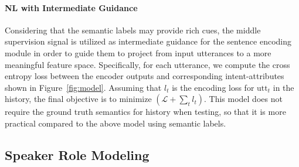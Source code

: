 \documentclass[11pt,letterpaper]{article}
\begin{document}
\paragraph{NL with Intermediate Guidance}
Considering that the semantic labels may provide rich cues, the middle supervision signal is utilized as intermediate guidance for the sentence encoding module in order to guide them to project from input utterances to a more meaningful feature space.
Specifically, for each utterance, we compute the cross entropy loss between the encoder outputs and corresponding intent-attributes shown in Figure~\ref{fig:model}.
Assuming that $l_t$ is the encoding loss for $\text{utt}_t$ in the history, the final objective is to minimize $(\mathcal{L}+\sum_t{l_t})$.
This model does not require the ground truth semantics for history when testing, so that it is more practical compared to the above model using semantic labels.

\subsection{Speaker Role Modeling}
\label{ssec:rolebasedmodel}
\end{document}
